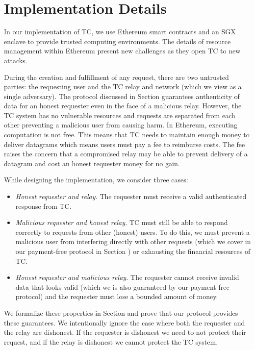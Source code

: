 
\section{\tc Implementation Details}
\label{sec:impl}

In our implementation of TC, we use Ethereum smart contracts and an SGX enclave to provide trusted computing environments.
The details of resource management within Ethereum present new challenges as they open TC to new attacks.

During the creation and fulfillment of any request, there are two untrusted parties:
the requesting user and the TC relay and network (which we view as a single adversary).
The protocol discussed in Section  guarantees authenticity of data for an honest requester even in the face of a malicious relay.
However, the TC system has no vulnerable resources and requests are separated from each other preventing a malicious user from causing harm.
In Ethereum, executing computation is not free.
This means that TC needs to maintain enough money to deliver datagrams which means users must pay a fee to reimburse costs.
The fee raises the concern that a compromised relay may be able to prevent delivery of a datagram and cost an honest requester money for no gain.

While designing the implementation, we consider three cases:
\begin{itemize}
  \item {\it Honest requester and relay.}
    The requester must receive a valid authenticated response from TC.

  \item {\it Malicious requester and honest relay.}
    TC must still be able to respond correctly to requests from other (honest) users.
    To do this, we must prevent a malicious user from interfering directly with other requests (which we cover in our payment-free protocol in Section )
    or exhausting the financial resources of TC.

  \item {\it Honest requester and malicious relay.}
    The requester cannot receive invalid data that looks valid (which we is also guaranteed by our payment-free protocol)
    and the requester must lose a bounded amount of money.
\end{itemize}
We formalize these properties in Section  and prove that our protocol provides these guarantees.
We intentionally ignore the case where both the requester and the relay are dishonest.
If the requester is dishonest we need to not protect their request, and if the relay is dishonest we cannot protect the TC system.


